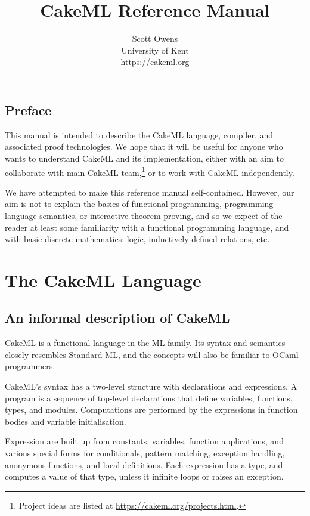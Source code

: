 \documentclass[12pt,a4paper]{book}
\title{CakeML Reference Manual}
\author{Scott Owens\\
University of Kent\\
\url{https://cakeml.org}
}
\begin{document}
\sloppy
\maketitle
\frenchspacing

\frontmatter

\chapter{Preface}

This manual is intended to describe the CakeML language, compiler, and associated proof technologies. We hope that it will be useful for anyone who wants to understand  CakeML and its implementation, either with an aim to collaborate with main CakeML team,\footnote{Project ideas are listed at \url{https://cakeml.org/projects.html}.}
or to work with CakeML independently.

We have attempted to make this reference manual self-contained. However, our aim is not to explain the basics of functional programming, programming language semantics, or interactive theorem proving, and so we expect of the reader at least some familiarity with a functional programming language, and with basic discrete mathematics: logic, inductively defined relations, etc.

\mainmatter
\tableofcontents


\part{The CakeML Language}

\chapter{An informal description of CakeML}

CakeML is a functional language in the ML family. Its syntax and semantics
closely resembles Standard ML, and the concepts will also be familiar to OCaml
programmers.

CakeML's syntax has a two-level structure with declarations and expressions. A
program is a sequence of top-level declarations that define variables,
functions, types, and modules. Computations are performed by the expressions in
function bodies and variable initialisation.

Expression are built up from constants, variables, function applications, and
various special forms for conditionals, pattern matching, exception handling,
anonymous functions, and local definitions. Each expression has a type, and
computes a value of that type, unless it infinite loops or raises an exception.
\end{document}
